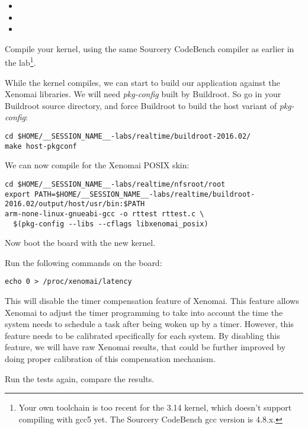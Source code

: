 \begin{itemize}
\item {}
\item {}
\item {}
\end{itemize}

Compile your kernel, using the same Sourcery CodeBench compiler
as earlier in the lab\footnote{Your own toolchain is too recent
for the 3.14 kernel, which doesn't support compiling with gcc5 yet. The
Sourcery CodeBench gcc version is 4.8.x.}.

While the kernel compiles, we can start to build our application against
the Xenomai libraries. We will need {\em pkg-config} built by Buildroot.
So go in your Buildroot source directory, and force Buildroot to build
the host variant of {\em pkg-config}:

\begin{verbatim}
cd $HOME/__SESSION_NAME__-labs/realtime/buildroot-2016.02/
make host-pkgconf
\end{verbatim}

We can now compile  for the Xenomai POSIX skin:

\small
\begin{verbatim}
cd $HOME/__SESSION_NAME__-labs/realtime/nfsroot/root
export PATH=$HOME/__SESSION_NAME__-labs/realtime/buildroot-2016.02/output/host/usr/bin:$PATH
arm-none-linux-gnueabi-gcc -o rttest rttest.c \
  $(pkg-config --libs --cflags libxenomai_posix)
\end{verbatim}
\normalsize

Now boot the board with the new kernel.

Run the following commands on the board:

\begin{verbatim}
echo 0 > /proc/xenomai/latency
\end{verbatim}

This will disable the timer compensation feature of Xenomai. This
feature allows Xenomai to adjust the timer programming to take into
account the time the system needs to schedule a task after being woken
up by a timer. However, this feature needs to be calibrated
specifically for each system. By disabling this feature, we will have
raw Xenomai results, that could be further improved by doing proper
calibration of this compensation mechanism.

Run the tests again, compare the results.
